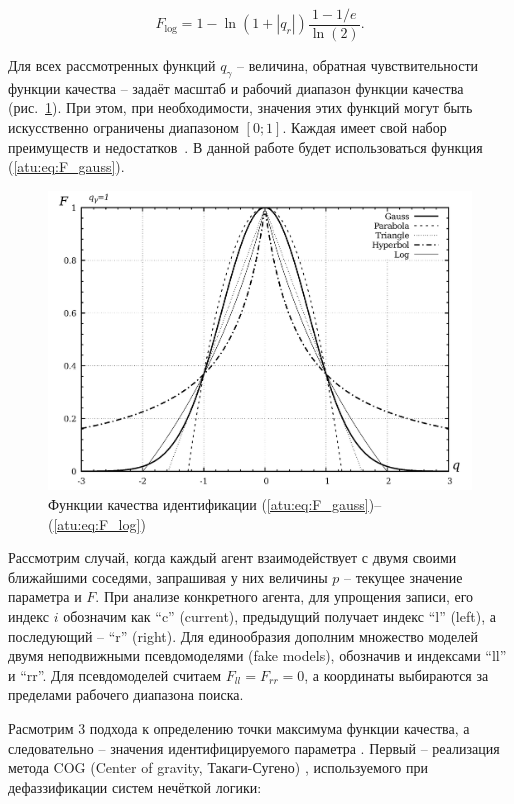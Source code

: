 \documentclass[a4paper,paratype,12pt,fouriernc]{cmonogra}
\begin{document}
\begin{equation}
  F_{\mathrm{log}} = 1 - \ln \left( 1 + |q_r| \right) \frac{1-1/e}{\ln(2)}.
\label{atu:eq:F_log}
\end{equation}

Для всех рассмотренных функций $q_\gamma$ -- величина, обратная чувствительности
функции качества -- задаёт масштаб и рабочий диапазон функции качества (рис.~\ref{atu:f:F_types}).
При этом, при необходимости, значения этих функций могут быть искусственно ограничены диапазоном $[0;1]$.
Каждая имеет свой набор преимуществ и недостатков~\cite{atu_ISDMCI2016}. В данной работе будет использоваться
функция (\ref{atu:eq:F_gauss}).

\begin{figure}[htb!]
  \centerline{\includegraphics[width=45\TW]{p/F_types.png} }
  \caption{Функции качества идентификации (\ref{atu:eq:F_gauss})--(\ref{atu:eq:F_log})}
  \label{atu:f:F_types}
\end{figure}

Рассмотрим случай, когда каждый агент взаимодействует с двумя своими ближайшими соседями,
запрашивая у них величины $p$ -- текущее значение параметра и $F$.
При анализе конкретного агента, для упрощения записи, его индекс $i$ обозначим как ``c'' (current),
предыдущий получает индекс ``l'' (left), а последующий -- ``r'' (right).
Для единообразия дополним множество моделей двумя неподвижными псевдомоделями (fake models),
обозначив и индексами ``ll'' и ``rr''. Для псевдомоделей считаем $  F_{ll} = F_{rr} = 0$,
а координаты выбираются за пределами рабочего диапазона поиска.


Расмотрим 3 подхода к определению
точки максимума функции качества, а следовательно -- значения идентифицируемого параметра \cite{atu_st99}.
Первый -- реализация
метода COG (Center of gravity, Такаги-Сугено) \cite{atu_asau25},
используемого при дефаззификации систем нечёткой логики:
\end{document}
